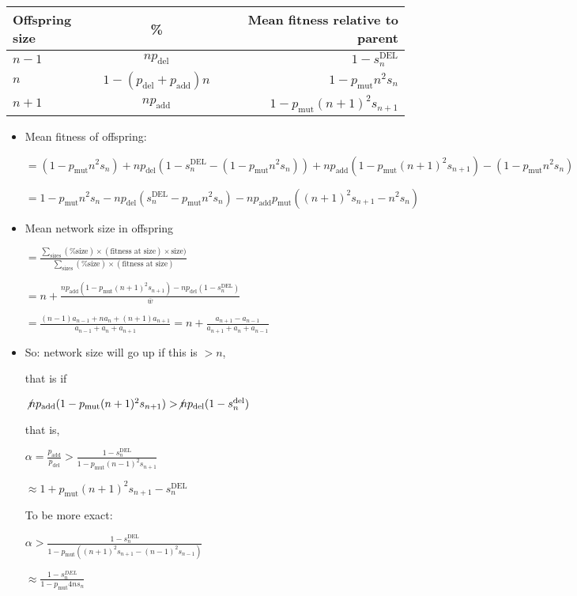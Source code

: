 \documentclass{article}
\begin{document}
\begin{tabular}{l | c | r}
\hline
Offspring size & \% & Mean fitness relative to parent \\
\hline
$n-1$ & $n p_{\text{del}}$ & $1 - s^{\text{DEL}}_{n}$ \\
\hline
$n$ & $1 - (p_{\text{del}} + p_{\text{add}})n$ & $1 - p_{\text{mut}} n^2 s_n$ \\
\hline
$n+1$ & $n p_{\text{add}}$ & $1 - p_{\text{mut}}(n + 1)^2 s_{n+1}$ \\ 
\hline
\end{tabular}
\begin{itemize}
\item Mean fitness of offspring:

$= (1 - p_{\text{mut}} n^2 s_n) + n p_{\text{del}} (1 - s^{\text{DEL}}_{n} - (1 - p_{\text{mut}} n^2 s_n)) + n p_{\text{add}} (1 - p_{\text{mut}}(n + 1)^2 s_{n+1}) - (1 - p_{\text{mut}} n^2 s_n)$ 

$= 1 - p_{\text{mut}} n^2 s_n - n p_{\text{del}} (s^{\text{DEL}}_{n} - p_{\text{mut}}n^2 s_n) - n p_{\text{add}} p_{\text{mut}} ((n+1)^2 s_{n+1} - n^2 s_n)$

\item Mean network size in offspring

$ = \frac{\sum_{\text{sizes}} (\% \text{size}) \times (\text{fitness at size}) \times \text{size})}{\sum_{\text{sizes}} (\% \text{size}) \times (\text{fitness at size})}$

$= n + \frac{n p_{\text{add}} (1 - p_{\text{mut}}(n+1)^2 s_{n+1}) - n p_{\text{del}} (1 - s^{\text{DEL}}_{n})}{\bar{w}}$

$= \frac{(n-1) a_{n-1} + n a_n + (n+1) a_{n+1}}{a_{n-1} + a_n + a_{n+1}} = n + \frac{a_{n+1} - a_{n-1}}{a_{n+1}+a_n + a_{n-1}}$

\item So: network size will go up if this is $>n$,

that is if

$\not n p_{\text{add}} (1 - p_{\text{mut}}(n+1)^2 s_{n+1}) > \not n p_{\text{del}} (1 - s_n^{\text{\text{del}}})$

that is,

$\alpha = \frac{p_{\text{add}}}{p_{\text{del}}} > \frac{1 - s^{\text{DEL}}_{n}}{1 - p_{\text{mut}}(n-1)^2 s_{n+1}}$

$\approx 1 + p_{\text{mut}} (n+1)^2 s_{n+1} - s^{\text{DEL}}_{n}$

To be more exact:

$\alpha > \frac{1 -s^{\text{DEL}}_{n}}{1 - p_{\text{mut}} ((n+1)^2 s_{n+1} - (n-1)^2 s_{n-1})}$

$\approx \frac{1 - s^{DEL}_{n}}{1 - p_{\text{mut}} 4ns_n}$
\end{itemize}
\end{document}
